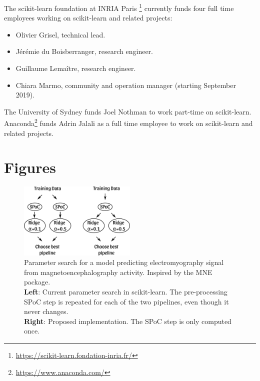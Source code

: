 \documentclass[11pt]{article}  %
\begin{document}
The scikit-learn foundation at INRIA Paris
\footnote{\href{https://scikit-learn.fondation-inria.fr/}{https://scikit-learn.fondation-inria.fr/}}
currently funds four full time employees working on scikit-learn and related
projects:
\begin{itemize}
\item Olivier Grisel, technical lead.
\item J\'er\'emie du Boisberranger, research engineer.
\item Guillaume Lema\^itre, research engineer.
\item Chiara Marmo, community and operation manager (starting September 2019).
\end{itemize}

The University of Sydney funds Joel Nothman to work part-time on
scikit-learn.
Anaconda\footnote{\href{https://www.anaconda.com/}{https://www.anaconda.com/}}
funds Adrin Jalali as a full time employee to work on scikit-learn and
related projects.

\clearpage
\section*{Figures}

\begin{figure}[h!]
  \centering
    \includegraphics[width=0.5\textwidth]{drawing}
  \caption{
      Parameter search for a model predicting electromyography signal
      from magnetoencephalography activity. Inspired by the MNE
      package\cite{MNE}.\\
      \textbf{Left}: Current parameter search in
      scikit-learn. The pre-processing SPoC step is repeated for each of the
      two pipelines, even though it never changes.\\
      \textbf{Right}: Proposed implementation. The SPoC step is only
      computed once.
      }
      \label{fig:fast_grid_search}
\end{figure}

\clearpage

\end{document}
